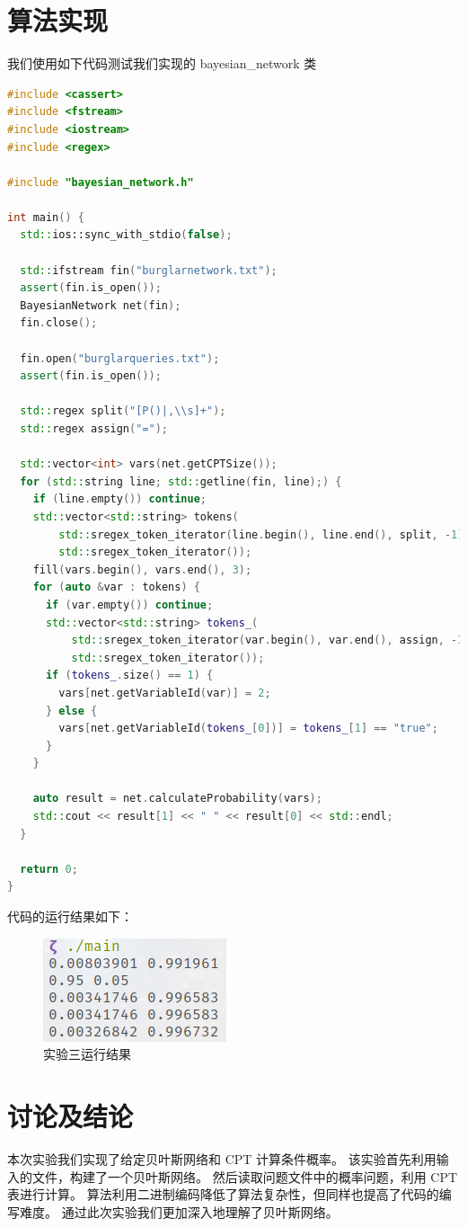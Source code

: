 \documentclass[12pt,onecolumn]{report}
\theoremstyle{plain}
\numberwithin{figure}{section}
\begin{document}
\section{算法实现}
我们使用如下代码测试我们实现的 bayesian\_network 类

\begin{lstlisting}[language=c++]
#include <cassert>
#include <fstream>
#include <iostream>
#include <regex>

#include "bayesian_network.h"

int main() {
  std::ios::sync_with_stdio(false);

  std::ifstream fin("burglarnetwork.txt");
  assert(fin.is_open());
  BayesianNetwork net(fin);
  fin.close();

  fin.open("burglarqueries.txt");
  assert(fin.is_open());

  std::regex split("[P()|,\\s]+");
  std::regex assign("=");

  std::vector<int> vars(net.getCPTSize());
  for (std::string line; std::getline(fin, line);) {
    if (line.empty()) continue;
    std::vector<std::string> tokens(
        std::sregex_token_iterator(line.begin(), line.end(), split, -1),
        std::sregex_token_iterator());
    fill(vars.begin(), vars.end(), 3);
    for (auto &var : tokens) {
      if (var.empty()) continue;
      std::vector<std::string> tokens_(
          std::sregex_token_iterator(var.begin(), var.end(), assign, -1),
          std::sregex_token_iterator());
      if (tokens_.size() == 1) {
        vars[net.getVariableId(var)] = 2;
      } else {
        vars[net.getVariableId(tokens_[0])] = tokens_[1] == "true";
      }
    }

    auto result = net.calculateProbability(vars);
    std::cout << result[1] << " " << result[0] << std::endl;
  }

  return 0;
}
\end{lstlisting}

代码的运行结果如下：
\begin{figure}[ht]
  \centering
  \includegraphics{figures/bayesian_network.png}
  \caption{实验三运行结果}
\end{figure}

\section{讨论及结论}
本次实验我们实现了给定贝叶斯网络和 CPT 计算条件概率。
该实验首先利用输入的文件，构建了一个贝叶斯网络。
然后读取问题文件中的概率问题，利用 CPT 表进行计算。
算法利用二进制编码降低了算法复杂性，但同样也提高了代码的编写难度。
通过此次实验我们更加深入地理解了贝叶斯网络。
\end{document}

